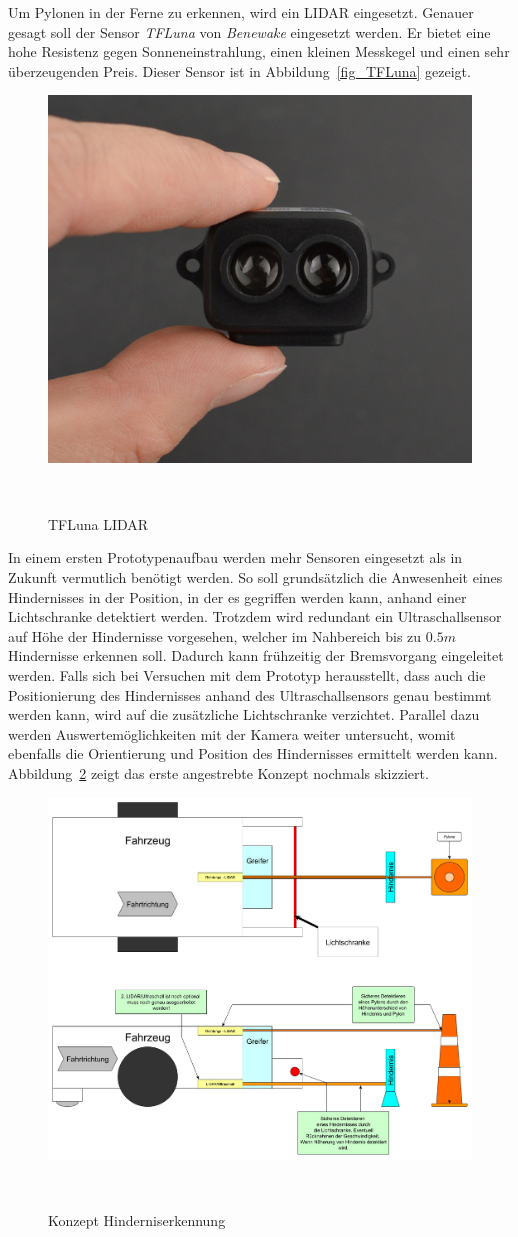 \documentclass[main.tex]{subfiles} %
\begin{document}
Um Pylonen in der Ferne zu erkennen, wird ein LIDAR eingesetzt. Genauer gesagt
soll der Sensor \textit{TFLuna} von \textit{Benewake} eingesetzt werden. Er
bietet eine hohe Resistenz gegen Sonneneinstrahlung, einen kleinen Messkegel
und einen sehr überzeugenden Preis. Dieser Sensor ist in
Abbildung~\ref{fig_TFLuna} gezeigt.

\begin{figure}[h!]
    \centering
    \includegraphics[width=0.25\linewidth]{./fig_Hinderniserkennung/TFLuna_Benewake.png}
    \caption{TFLuna LIDAR}~\label{fig:TFLuna}
\end{figure}

In einem ersten Prototypenaufbau werden mehr Sensoren eingesetzt als in Zukunft
vermutlich benötigt werden. So soll grundsätzlich die Anwesenheit eines
Hindernisses in der Position, in der es gegriffen werden kann, anhand einer
Lichtschranke detektiert werden. Trotzdem wird redundant ein Ultraschallsensor
auf Höhe der Hindernisse vorgesehen, welcher im Nahbereich bis zu $0.5m$
Hindernisse erkennen soll. Dadurch kann frühzeitig der Bremsvorgang eingeleitet
werden. Falls sich bei Versuchen mit dem Prototyp herausstellt, dass auch die
Positionierung des Hindernisses anhand des Ultraschallsensors genau bestimmt
werden kann, wird auf die zusätzliche Lichtschranke verzichtet. Parallel dazu
werden Auswertemöglichkeiten mit der Kamera weiter untersucht, womit ebenfalls
die Orientierung und Position des Hindernisses ermittelt werden kann.
Abbildung~\ref{fig:Hinderniserkennung} zeigt das erste angestrebte Konzept
nochmals skizziert.

\begin{figure}[h!]
    \centering
    \includegraphics[width=0.75\linewidth]{./fig_Hinderniserkennung/Konzept_Hinderniserkennung.pdf}
    \caption{Konzept Hinderniserkennung}~\label{fig:Hinderniserkennung}
\end{figure}
\end{document}
